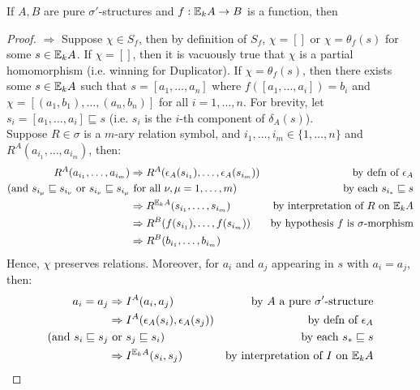 \begin{thm}
If $A,B$ are pure $\sigma'$-structures and $f:{\mathbb{E}_{k}A} \rightarrow B$ is a function, then 
\begin{proof}
$\Rightarrow$ Suppose $\chi \in S_{f}$, then by definition of $S_{f}$, $\chi = []$ or $\chi = \theta_{f}(s)$ for some $s \in {\mathbb{E}_{k}A}$. If $\chi = []$, then it is vacuously true that $\chi$ is a partial homomorphism (i.e. winning for Duplicator). If $\chi = \theta_{f}(s)$, then there exists some $s \in {\mathbb{E}_{k}A}$ such that $s = [a_{1},\dots,a_{n}]$ where $f([a_{1},\dots,a_{i}]) = b_{i}$ and $\chi = [(a_{1},b_{1}),\dots,(a_{n},b_{n})]$ for all $i = 1,\dots,n$. For brevity, let $s_{i} = [a_{1},\dots,a_{i}] \sqsubseteq s$ (i.e. $s_{i}$ is the $i$-th component of $\delta_{A}(s)$). \\
Suppose $R \in \sigma$ is a $m$-ary relation symbol, and $i_{1},\dots,i_{m} \in \{1,\dots,n\}$ and $R^{A}(a_{i_{1}},\dots,a_{i_{m}})$, then:
\begin{align*}
R^{A}(a_{i_{1}},\dots,a_{i_{m}}) &\Rightarrow R^{A}(\epsilon_{A}(s_{i_{1}}),\dots,\epsilon_{A}(s_{i_{m}})) & \text{by defn of $\epsilon_{A}$} \\
\text{(and } s_{i_{\mu}} \sqsubseteq s_{i_{\nu}} \text{ or } s_{i_{\nu}} \sqsubseteq s_{i_{\mu}} &\text{ for all } \nu,\mu = 1,\dots,m\text{)} &\text{by each } s_{i_{*}} \sqsubseteq s \\
&\Rightarrow R^{{\mathbb{E}_{k}A}}(s_{i_{1}},\dots,s_{i_{m}}) & \text{by interpretation of $R$ on ${\mathbb{E}_{k}A}$} \\
&\Rightarrow R^{B}(f(s_{i_{1}}),\dots,f(s_{i_{m}})) & \text{by hypothesis $f$ is $\sigma$-morphism}\\
&\Rightarrow R^{B}(b_{i_{1}},\dots,b_{i_{m}}) 
\end{align*}
Hence, $\chi$ preserves relations.
Moreover, for $a_{i}$ and $a_{j}$ appearing in $s$ with $a_{i} = a_{j}$, then:
\begin{align*}
a_{i} = a_{j}       &\Rightarrow I^{A}(a_{i},a_{j}) & \text{by $A$ a pure $\sigma'$-structure} \\
&\Rightarrow I^{A}(\epsilon_{A}(s_{i}),\epsilon_{A}(s_{j})) & \text{by defn of $\epsilon_{A}$} \\
\text{(and } s_{i} \sqsubseteq s_{j} &\text{ or } s_{j} \sqsubseteq s_{i}\text{)} &\text{by each } s_{*} \sqsubseteq s \\
&\Rightarrow I^{\efcomonad{k}{A}}(s_{i},s_{j}) & \text{by interpretation of $I$ on $\efcomonad{k}{A}$} \\

\end{align*}
\end{proof}
\end{thm}
